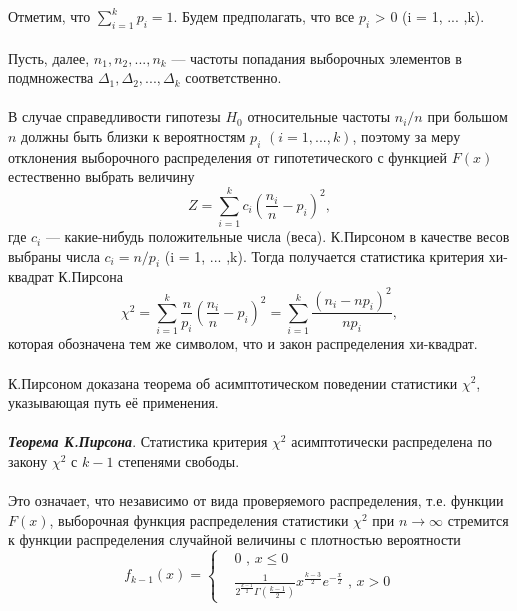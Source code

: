 \\\\
Отметим, что $\sum_{i=1}^{k}{p_{i}} = 1$.
Будем предполагать, что все $p_{i}$ > 0 (i = 1, ... ,k).
\\\\
Пусть, далее, $n_{1},n_{2}, ... ,n_{k}$ — частоты попадания выборочных элементов в подмножества $\Delta_{1},\Delta_{2}, ... ,\Delta_{k}$ соответственно.
\\\\
В случае справедливости гипотезы $H_{0}$ относительные частоты $n_{i}/n$ при большом $n$ должны быть близки к вероятностям $p_{i}$ $(i = 1, ... ,k)$, поэтому за меру отклонения выборочного распределения от гипотетического с функцией $F(x)$ естественно выбрать величину
\begin{equation}
Z = \sum_{i = 1}^{k}{c_{i}(\frac{n_{i}}{n} - p_{i})^{2}}, 
\label{Z}
\end{equation}
где $c_{i}$ — какие-нибудь положительные числа (веса). К.Пирсоном в качестве весов выбраны числа $c_{i} = n/p_{i}$ (i = 1, ... ,k). Тогда получается статистика критерия хи-квадрат К.Пирсона
\begin{equation}
\chi^{2} = \sum_{i = 1}^{k}{\frac{n}{p_{i}}(\frac{n_{i}}{n} - p_{i})^{2}} = \sum_{i = 1}^{k}{\frac{(n_{i} - np_{i})^{2}}{np_{i}}}, 
\label{chi_2}
\end{equation}
которая обозначена тем же символом, что и закон распределения хи-квадрат.
\\\\
К.Пирсоном доказана теорема об асимптотическом поведении статистики $\chi^{2}$, указывающая путь её применения.
\\\\
\textbf{\textit{Теорема К.Пирсона}}. Статистика критерия $\chi^{2}$ асимптотически распределена по закону $\chi^{2}$ с $k-1$ степенями свободы.
\\\\
Это означает, что независимо от вида проверяемого распределения, т.е. функции $F(x)$, выборочная функция распределения статистики $\chi^{2}$ при $n \rightarrow \infty$  стремится к функции распределения случайной величины с плотностью вероятности 
\begin{equation}
f_{k - 1}(x) = 
\begin{cases}
& 0 \text{ , } x  \leq 0  \\ 
& \frac{1}{2^{\frac{k-1}{2}}\Gamma(\frac{k-1}{2})}x^{\frac{k-3}{2}}e^{-\frac{x}{2}}
\text{ , } x>0 
\end{cases}
\label{f_k-1}
\end{equation}

